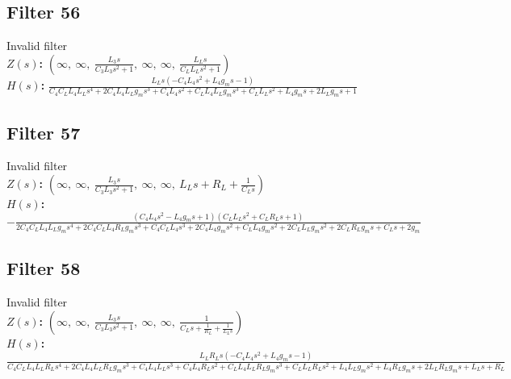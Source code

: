 \documentclass{article}
\begin{document}
\subsection*{Filter 56}
Invalid filter \\ 
\textbf{$Z(s)$:} $\left( \infty, \  \infty, \  \frac{L_{3} s}{C_{3} L_{3} s^{2} + 1}, \  \infty, \  \infty, \  \frac{L_{L} s}{C_{L} L_{L} s^{2} + 1}\right)$ \\ 
\textbf{$H(s)$:} $\frac{L_{L} s \left(- C_{4} L_{4} s^{2} + L_{4} g_{m} s - 1\right)}{C_{4} C_{L} L_{4} L_{L} s^{4} + 2 C_{4} L_{4} L_{L} g_{m} s^{3} + C_{4} L_{4} s^{2} + C_{L} L_{4} L_{L} g_{m} s^{3} + C_{L} L_{L} s^{2} + L_{4} g_{m} s + 2 L_{L} g_{m} s + 1}$ \\ 
\subsection*{Filter 57}
Invalid filter \\ 
\textbf{$Z(s)$:} $\left( \infty, \  \infty, \  \frac{L_{3} s}{C_{3} L_{3} s^{2} + 1}, \  \infty, \  \infty, \  L_{L} s + R_{L} + \frac{1}{C_{L} s}\right)$ \\ 
\textbf{$H(s)$:} $- \frac{\left(C_{4} L_{4} s^{2} - L_{4} g_{m} s + 1\right) \left(C_{L} L_{L} s^{2} + C_{L} R_{L} s + 1\right)}{2 C_{4} C_{L} L_{4} L_{L} g_{m} s^{4} + 2 C_{4} C_{L} L_{4} R_{L} g_{m} s^{3} + C_{4} C_{L} L_{4} s^{3} + 2 C_{4} L_{4} g_{m} s^{2} + C_{L} L_{4} g_{m} s^{2} + 2 C_{L} L_{L} g_{m} s^{2} + 2 C_{L} R_{L} g_{m} s + C_{L} s + 2 g_{m}}$ \\ 
\subsection*{Filter 58}
Invalid filter \\ 
\textbf{$Z(s)$:} $\left( \infty, \  \infty, \  \frac{L_{3} s}{C_{3} L_{3} s^{2} + 1}, \  \infty, \  \infty, \  \frac{1}{C_{L} s + \frac{1}{R_{L}} + \frac{1}{L_{L} s}}\right)$ \\ 
\textbf{$H(s)$:} $\frac{L_{L} R_{L} s \left(- C_{4} L_{4} s^{2} + L_{4} g_{m} s - 1\right)}{C_{4} C_{L} L_{4} L_{L} R_{L} s^{4} + 2 C_{4} L_{4} L_{L} R_{L} g_{m} s^{3} + C_{4} L_{4} L_{L} s^{3} + C_{4} L_{4} R_{L} s^{2} + C_{L} L_{4} L_{L} R_{L} g_{m} s^{3} + C_{L} L_{L} R_{L} s^{2} + L_{4} L_{L} g_{m} s^{2} + L_{4} R_{L} g_{m} s + 2 L_{L} R_{L} g_{m} s + L_{L} s + R_{L}}$ \\ 
\end{document}
